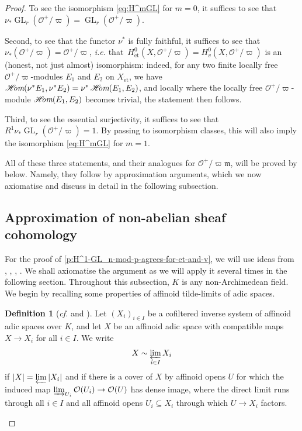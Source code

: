 \documentclass[11pt]{amsart}
\numberwithin{equation}{section}
\theoremstyle{definition}
\newtheorem{Definition}[thm]{Definition}
\theoremstyle{remark}
\renewcommand{\O}{\mathcal{O}}
\newcommand{\m}{\mathfrak{m}}
\newcommand{\GL}{\operatorname{GL}}
\newcommand{\et}{{\operatorname{\acute{e}t}}}
\DeclareMathOperator{\HOM}{\mathscr{H}\hspace{-0.3em}\mathrm{\textit{om}}}
\begin{document}
\begin{proof}
	To see the isomorphism  \eqref {eq:H^mGL} for $m=0$, it suffices to see that $\nu_{\ast}\GL_r(\O^+/\varpi)=\GL_r(\O^+/\varpi)$.
	
	Second, to see that the functor $\nu^\ast$ is fully faithful, it suffices to see that $\nu_{\ast}(\O^+/\varpi)=\O^+/\varpi$, \textit{i.e.} that~$H^0_{\et}(X,\O^+/\varpi)=H^0_{v}(X,\O^+/\varpi)$
	is an (honest, not just almost) isomorphism:
	indeed, for any two finite locally free $\O^+/\varpi$-modules $E_1$ and $E_2$ on $X_{\et}$, we have $\HOM(\nu^{\ast}E_1,\nu^{\ast}E_2)=\nu^{\ast}\HOM(E_1,E_2)$, and locally where the locally free $\O^+/\varpi$-module $\HOM(E_1,E_2)$ becomes trivial, the statement then follows.
	
	Third, to see the essential surjectivity, it suffices to see that $R^1\nu_{\ast}\GL_r(\O^+/\varpi)=1$. By passing to isomorphism classes, this will also imply the isomorphism \eqref{eq:H^mGL} for $m=1$.
	
	All of these three statements, and their analogues for $\O^+/\varpi\m$, will be proved by  below. Namely, they follow by approximation arguments, which we now axiomatise and discuss in detail in the following subsection.
	
	\subsection{Approximation of non-abelian sheaf cohomology}\label{s:approximation}
	For the proof of \cref{p:H^1-GL_n-mod-p-agrees-for-et-and-v}, we will use ideas from \cite[Section~3]{Scholze_p-adicHodgeForRigid}, \cite[Proposition~14.7]{etale-cohomology-of-diamonds}, \cite[Section~2]{MannWerner_LocSys_p-adVB}, \cite[Theorem 2.18]{heuer-Picard-good-reduction}. We  shall axiomatise the argument as we will apply it several times in the following section. Throughout this subsection, $K$ is any non-Archimedean field.
	We begin by recalling some properties of affinoid tilde-limits of adic spaces.
        
	\begin{Definition}[\textit{cf.} {\cite[Equation~(2.4.1)]{huber2013etale} and \cite[Section~2.4]{ScholzeWeinstein}}]\label{d:tilde-limits}
		Let  $(X_i)_{i\in I}$ be a cofiltered inverse system of affinoid adic spaces over $K$, and let $X$ be an affinoid adic space with compatible maps $X\to X_i$ for all $i\in I$. We write
		\[ X\sim \varprojlim_{i\in I} X_i\]
		if $|X|=\varprojlim |X_i|$ and if there is a cover of $X$ by affinoid opens $U$ for which the induced map $\varinjlim_{U_i}\O(U_i)\to \O(U)$
		has dense image, where the direct limit runs through all $i\in I$ and all affinoid opens  $U_i\subseteq X_i$ through which $U\to X_i$ factors.
	\end{Definition}


\end{proof}
\end{document}
